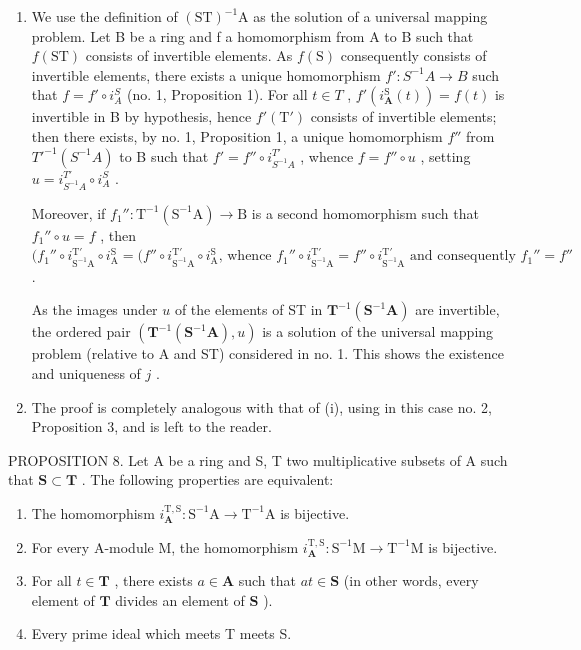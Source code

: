 \begin{enumerate}
\def\labelenumi{(\roman{enumi})}
\tightlist
\item
  We use the definition of \((\mathrm{ST})^{-1}\mathrm{A}\) as the solution of a universal mapping problem. Let B be a ring and f a homomorphism from A to B such that \(f(\mathrm{ST})\) consists of invertible elements. As \(f(\mathrm{S})\) consequently consists of invertible elements, there exists a unique homomorphism \(f': S^{-1}A \to B\) such that \(f = f' \circ i_{A}^{S}\) (no. 1, Proposition 1). For all \(t \in T\) , \(f'(i_{\mathbf{A}}^{\mathrm{S}}(t)) = f(t)\) is invertible in B by hypothesis, hence \(f'(\mathrm{T}')\) consists of invertible elements; then there exists, by no. 1, Proposition 1, a unique homomorphism \(f''\) from \(T'^{-1}(S^{-1}A)\) to B such that \(f' = f'' \circ i_{S^{-1}A}^{T'}\) , whence \(f = f'' \circ u\) , setting \(u = i_{S^{-1}A}^{T'} \circ i_{A}^{S}\) .

Moreover, if \(f_1'' \colon \mathrm{T}^{-1}(\mathrm{S}^{-1}\mathrm{A}) \to \mathrm{B}\) is a second homomorphism such that \(f_1'' \circ u = f\) , then \((f_1'' \circ i_{\mathrm{S}^{-1}\mathrm{A}}^{\mathrm{T}'} \circ i_{\mathrm{A}}^{\mathrm{S}} = (f'' \circ i_{\mathrm{S}^{-1}\mathrm{A}}^{\mathrm{T}'} \circ i_{\mathrm{A}}^{\mathrm{S}} \text{, whence } f_1'' \circ i_{\mathrm{S}^{-1}\mathrm{A}}^{\mathrm{T}'} = f'' \circ i_{\mathrm{S}^{-1}\mathrm{A}}^{\mathrm{T}'} \text{ and consequently } f_1'' = f''\) .

As the images under \(u\) of the elements of ST in \(\mathbf{T}^{-1}(\mathbf{S}^{-1}\mathbf{A})\) are invertible, the ordered pair \((\mathbf{T}^{-1}(\mathbf{S}^{-1}\mathbf{A}), u)\) is a solution of the universal mapping problem (relative to A and ST) considered in no. 1. This shows the existence and uniqueness of \(j\) .

\item
  The proof is completely analogous with that of (i), using in this case no. 2, Proposition 3, and is left to the reader.
\end{enumerate}

PROPOSITION 8. Let A be a ring and S, T two multiplicative subsets of A such that \(\mathbf{S} \subset \mathbf{T}\) . The following properties are equivalent:

\begin{enumerate}
\def\labelenumi{(\alph{enumi})}
\item
  The homomorphism \(i_{\mathbf{A}}^{\mathrm{T},\mathrm{S}}: \mathrm{S}^{-1}\mathrm{A} \to \mathrm{T}^{-1}\mathrm{A}\) is bijective.
\item
  For every A-module M, the homomorphism \(i_{\mathbf{A}}^{\mathrm{T},\mathrm{S}}: \mathrm{S}^{-1}\mathrm{M} \to \mathrm{T}^{-1}\mathrm{M}\) is bijective.
\item
  For all \(t \in \mathbf{T}\) , there exists \(a \in \mathbf{A}\) such that \(at \in \mathbf{S}\) (in other words, every element of \(\mathbf{T}\) divides an element of \(\mathbf{S}\) ).
\item
  Every prime ideal which meets T meets S.
\end{enumerate}

